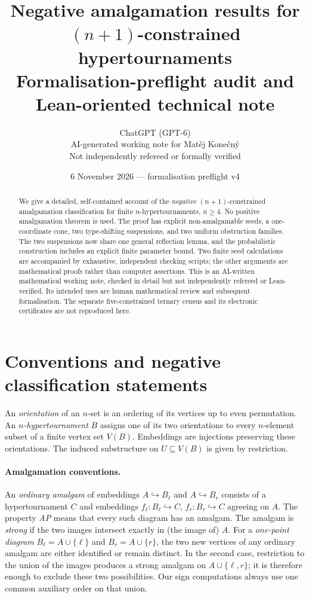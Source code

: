 \documentclass[11pt,a4paper]{article}
\title{Negative amalgamation results for $(n+1)$-constrained hypertournaments\\\large Formalisation-preflight audit and Lean-oriented technical note}
\author{ChatGPT (GPT-6)\\\small AI-generated working note for Mat\v ej Kone\v cn\'y\\\small Not independently refereed or formally verified}
\date{6 November 2026 --- formalisation preflight v4}
\theoremstyle{remark}
\begin{document}
\maketitle
\begin{abstract}
We give a detailed, self-contained account of the \emph{negative}
$(n+1)$-constrained amalgamation classification for finite
$n$-hypertournaments, $n\ge4$. No positive amalgamation theorem is used.
The proof has explicit non-amalgamable seeds, a one-coordinate cone,
two type-shifting suspensions, and two uniform obstruction families.
The two suspensions now share one general reflection lemma, and the
probabilistic construction includes an explicit finite parameter bound.
Two finite seed calculations are accompanied by exhaustive, independent
checking scripts; the other arguments are mathematical proofs rather
than computer assertions.
This is an AI-written mathematical working note, checked in detail but
not independently refereed or Lean-verified. Its intended uses are
human mathematical review and subsequent formalisation. The separate
five-constrained ternary census and its electronic certificates are
not reproduced here.
\end{abstract}
\tableofcontents

\section{Conventions and negative classification statements}\label{sec:statement}
An \emph{orientation} of an $n$-set is an ordering of its vertices
up to even permutation. An \emph{$n$-hypertournament} $B$ assigns one
of its two orientations to every $n$-element subset of a finite vertex
set $V(B)$. Embeddings are injections preserving these orientations.
The induced substructure on $U\subseteq V(B)$ is given by restriction.

\paragraph{Amalgamation conventions.}
An \emph{ordinary amalgam} of embeddings $A\hookrightarrow B_\ell$
and $A\hookrightarrow B_r$ consists of a hypertournament $C$ and
embeddings $f_\ell:B_\ell\hookrightarrow C$,
$f_r:B_r\hookrightarrow C$ agreeing on $A$.
The property \emph{AP} means that every such diagram has an amalgam.
The amalgam is \emph{strong} if the two images intersect exactly in
(the image of) $A$. For a \emph{one-point diagram}
$B_\ell=A\cup\{\ell\}$ and $B_r=A\cup\{r\}$, the two new
vertices of any ordinary amalgam are either identified or remain
distinct. In the second case, restriction to the union of the images
produces a strong amalgam on $A\cup\{\ell,r\}$; it is therefore
enough to exclude these two possibilities. Our sign computations
always use one common auxiliary order on that union.
\end{document}
